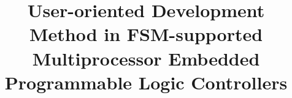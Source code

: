 \documentclass[journal,UTF8]{IEEEtran}
\begin{document}
%
\title{User-oriented Development Method in FSM-supported Multiprocessor Embedded Programmable Logic Controllers}
% 
% 
%
%
%



%
%





%
\end{document}
